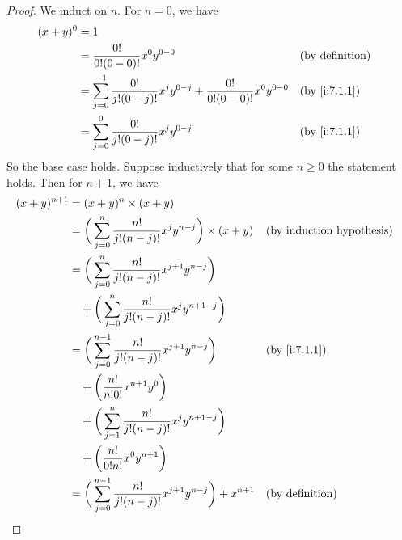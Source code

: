 \begin{proof}
  We induct on \(n\).
  For \(n = 0\), we have
  \begin{align*}
    (x + y)^0 & = 1                                                                                                                         \\
              & = \dfrac{0!}{0!(0 - 0)!} x^0 y^{0 - 0}                                                          &  & \text{(by definition)} \\
              & = \sum_{j = 0}^{-1} \dfrac{0!}{j!(0 - j)!} x^j y^{0 - j} + \dfrac{0!}{0!(0 - 0)!} x^0 y^{0 - 0} &  & \by{i:7.1.1}           \\
              & = \sum_{j = 0}^0 \dfrac{0!}{j!(0 - j)!} x^j y^{0 - j}                                           &  & \by{i:7.1.1}
  \end{align*}
  So the base case holds.
  Suppose inductively that for some \(n \geq 0\) the statement holds.
  Then for \(n + 1\), we have
  \begin{align*}
    (x + y)^{n + 1} & = (x + y)^n \times (x + y)                                                                                              \\
                    & = \bigg(\sum_{j = 0}^n \dfrac{n!}{j!(n - j)!} x^j y^{n - j}\bigg) \times (x + y)            &  & \byIH                  \\
                    & = \bigg(\sum_{j = 0}^n \dfrac{n!}{j!(n - j)!} x^{j + 1} y^{n - j}\bigg)                                                 \\
                    & \quad + \bigg(\sum_{j = 0}^n \dfrac{n!}{j!(n - j)!} x^j y^{n + 1 - j}\bigg)                                             \\
                    & = \bigg(\sum_{j = 0}^{n - 1} \dfrac{n!}{j!(n - j)!} x^{j + 1} y^{n - j}\bigg)               &  & \by{i:7.1.1}           \\
                    & \quad + \bigg(\dfrac{n!}{n!0!} x^{n + 1} y^0\bigg)                                                                      \\
                    & \quad + \bigg(\sum_{j = 1}^n \dfrac{n!}{j!(n - j)!} x^j y^{n + 1 - j}\bigg)                                             \\
                    & \quad + \bigg(\dfrac{n!}{0!n!} x^0 y^{n + 1}\bigg)                                                                      \\
                    & = \bigg(\sum_{j = 0}^{n - 1} \dfrac{n!}{j!(n - j)!} x^{j + 1} y^{n - j}\bigg) + x^{n + 1}   &  & \text{(by definition)} \\

\end{align*}
\end{proof}
